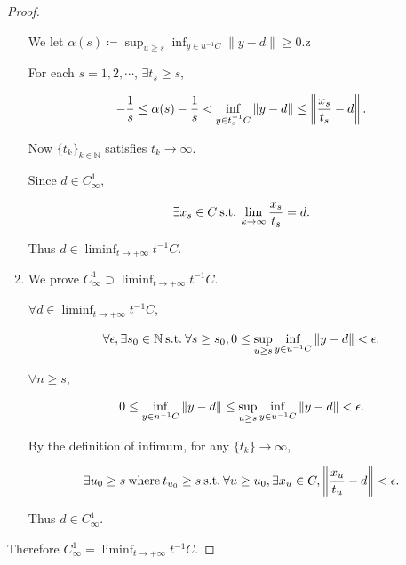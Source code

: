 \documentclass[a4paper,11pt]{jsarticle}
\newcommand{\NaturalNumberSet}{\mathbb{N}}
\newcommand{\SuchThat}{\:\text{s.t.}\:}
\begin{document}
\begin{proof}
\begin{enumerate}[label=ii-\alph*,align=CenterWithParen2]
    We let $\alpha (s) \coloneqq \sup_{u \geq s} \inf_{y \in u^{-1} C} \left\lVert y - d \right\rVert \geq 0$.z

    For each $s = 1,2,\cdots$, $\exists t_s \geq s$,

    \begin{equation}
      - \frac{1}{s} \leq \alpha (s) - \frac{1}{s} < \inf_{y \in t_{s}^{-1} C} \left\lVert y - d \right\rVert \leq \left\lVert \frac{x_s}{t_s} - d \right\rVert. \notag
    \end{equation}

    Now $\{t_k\}_{k \in \NaturalNumberSet}$ satisfies $t_k \to \infty$.

    Since $d \in C_{\infty}^{1}$,

    \begin{equation}
      \exists x_s \in C \SuchThat \lim_{k \to \infty} \frac{x_s}{t_s} = d. \notag
    \end{equation}

    Thus $d \in \liminf_{t \to + \infty} t^{-1}C$.

    \item We prove $C_{\infty}^{1} \supset \liminf_{t \to + \infty} t^{-1}C$.

    $\forall d \in \liminf_{t \to + \infty} t^{-1}C$,

    \begin{equation}
      \forall \epsilon, \exists s_0 \in \NaturalNumberSet \SuchThat \forall s \geq s_0, 0 \leq \sup_{u \geq s} \inf_{y \in u^{-1} C} \left\lVert y - d \right\rVert < \epsilon. \notag
    \end{equation}

    $\forall n \geq s$,

    \begin{equation}
      0 \leq \inf_{y \in n^{-1}C} \left\lVert y - d \right\rVert \leq \sup_{u \geq s} \inf_{y \in u^{-1} C} \left\lVert y - d \right\rVert < \epsilon. \notag
    \end{equation}

    By the definition of infimum, for any $\{t_k\} \to \infty$,

    \begin{equation}
      \exists u_0 \geq s \:\text{where}\: t_{u_0} \geq s \SuchThat \forall u \geq u_0, \exists x_u \in C, \left\lVert \frac{x_u}{t_u} - d \right\rVert < \epsilon. \notag
    \end{equation}

    Thus $d \in C_{\infty}^{1}$.

  \end{enumerate}

  Therefore $C_{\infty}^{1} = \liminf_{t \to + \infty} t^{-1}C$.
\end{proof}
\end{document}
